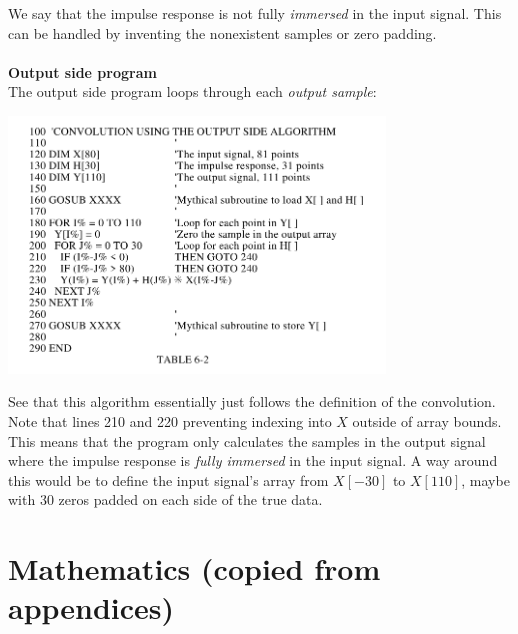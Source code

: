 \documentclass{report}
\begin{document}
We say that the impulse response is not fully \textit{immersed} in the input signal. 
This can be handled by inventing the nonexistent samples or zero padding.\\
\vspace{1mm}\\
\textbf{Output side program}\\
The output side program loops through each \textit{output sample}:
\begin{center}
\includegraphics[width=10cm]{a8}\\
\end{center}
See that this algorithm essentially just follows the definition of the convolution. Note that lines 210 and 220
preventing indexing into $X$ outside of array bounds. This means that the program only
calculates the samples in the output signal where the impulse response is \textit{fully immersed} in
the input signal. A way around this would be to define the input signal's array from 
$X[-30]$ to $X[110]$, maybe with 30 zeros padded on each side of the true data.
\newpage

\section{}



\newpage
\appendix
\chapter{Mathematics (copied from appendices)}
\end{document}
